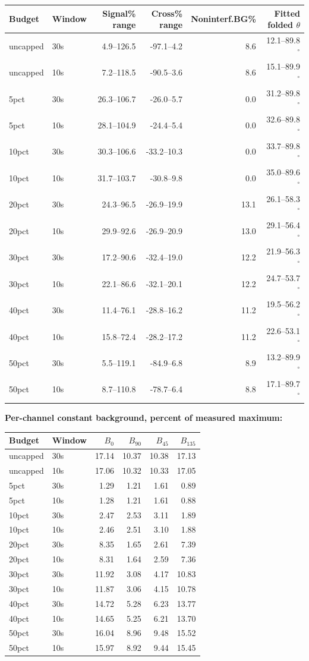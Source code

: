 \documentclass[10pt,a4paper]{article}
\begin{document}
\begin{longtable}{llrrrr}\toprule
Budget & Window & Signal\% range & Cross\% range & Noninterf.BG\% & Fitted folded $\theta$\\\midrule\endhead
uncapped & 30s & 4.9--126.5 & -97.1--4.2 & 8.6 & 12.1--89.8$^\circ$ \\
uncapped & 10s & 7.2--118.5 & -90.5--3.6 & 8.6 & 15.1--89.9$^\circ$ \\
5pct & 30s & 26.3--106.7 & -26.0--5.7 & 0.0 & 31.2--89.8$^\circ$ \\
5pct & 10s & 28.1--104.9 & -24.4--5.4 & 0.0 & 32.6--89.8$^\circ$ \\
10pct & 30s & 30.3--106.6 & -33.2--10.3 & 0.0 & 33.7--89.8$^\circ$ \\
10pct & 10s & 31.7--103.7 & -30.8--9.8 & 0.0 & 35.0--89.6$^\circ$ \\
20pct & 30s & 24.3--96.5 & -26.9--19.9 & 13.1 & 26.1--58.3$^\circ$ \\
20pct & 10s & 29.9--92.6 & -26.9--20.9 & 13.0 & 29.1--56.4$^\circ$ \\
30pct & 30s & 17.2--90.6 & -32.4--19.0 & 12.2 & 21.9--56.3$^\circ$ \\
30pct & 10s & 22.1--86.6 & -32.1--20.1 & 12.2 & 24.7--53.7$^\circ$ \\
40pct & 30s & 11.4--76.1 & -28.8--16.2 & 11.2 & 19.5--56.2$^\circ$ \\
40pct & 10s & 15.8--72.4 & -28.2--17.2 & 11.2 & 22.6--53.1$^\circ$ \\
50pct & 30s & 5.5--119.1 & -84.9--6.8 & 8.9 & 13.2--89.9$^\circ$ \\
50pct & 10s & 8.7--110.8 & -78.7--6.4 & 8.8 & 17.1--89.7$^\circ$ \\
\bottomrule\end{longtable}
\textbf{Per-channel constant background, percent of measured maximum:}
\begin{longtable}{llrrrr}\toprule
Budget & Window & $B_0$ & $B_{90}$ & $B_{45}$ & $B_{135}$\\\midrule\endhead
uncapped & 30s & 17.14 & 10.37 & 10.38 & 17.13\\
uncapped & 10s & 17.06 & 10.32 & 10.33 & 17.05\\
5pct & 30s & 1.29 & 1.21 & 1.61 & 0.89\\
5pct & 10s & 1.28 & 1.21 & 1.61 & 0.88\\
10pct & 30s & 2.47 & 2.53 & 3.11 & 1.89\\
10pct & 10s & 2.46 & 2.51 & 3.10 & 1.88\\
20pct & 30s & 8.35 & 1.65 & 2.61 & 7.39\\
20pct & 10s & 8.31 & 1.64 & 2.59 & 7.36\\
30pct & 30s & 11.92 & 3.08 & 4.17 & 10.83\\
30pct & 10s & 11.87 & 3.06 & 4.15 & 10.78\\
40pct & 30s & 14.72 & 5.28 & 6.23 & 13.77\\
40pct & 10s & 14.65 & 5.25 & 6.21 & 13.70\\
50pct & 30s & 16.04 & 8.96 & 9.48 & 15.52\\
50pct & 10s & 15.97 & 8.92 & 9.44 & 15.45\\
\bottomrule\end{longtable}
\newpage
\end{document}
